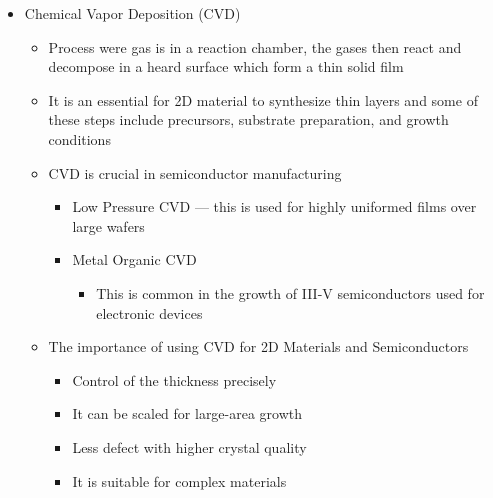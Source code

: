 \documentclass[conference]{IEEEtran}
\begin{document}
\begin{itemize}

  \item Chemical Vapor Deposition (CVD)

    \begin{itemize}

      \item Process were gas is in a reaction chamber, the gases then react and decompose in a heard surface which form a thin solid film 

      \item It is an essential for 2D material to synthesize thin layers and some of these steps include precursors, substrate preparation, and growth conditions 

      \item CVD is crucial in semiconductor manufacturing 

        \begin{itemize}

          \item Low Pressure CVD — this is used for highly uniformed films over large wafers 

          \item Metal Organic CVD

            \begin{itemize}

              \item This is common in the growth of III-V semiconductors used for electronic devices 

            \end{itemize}

        \end{itemize}

      \item The importance of using CVD for 2D Materials and Semiconductors 

        \begin{itemize}

          \item Control of the thickness precisely 

          \item It can be scaled for large-area growth 
            
          \item Less defect with higher crystal quality

          \item It is suitable for complex materials 


\end{itemize}
\end{itemize}
\end{itemize}
\end{document}
